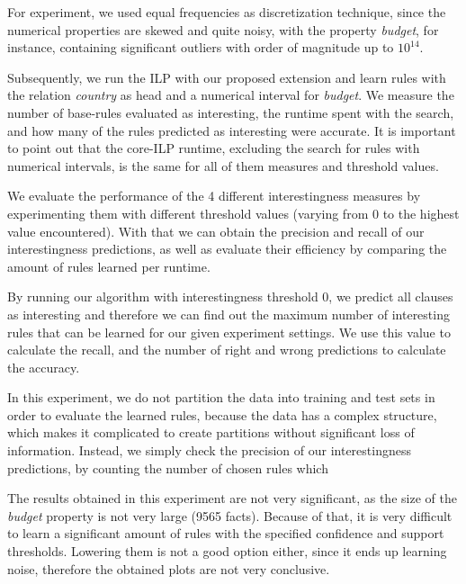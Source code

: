 For experiment, we used equal frequencies as discretization technique, since the numerical properties are skewed and
quite noisy, with the property \emph{budget}, for instance, containing significant outliers with order of magnitude up
to $10^{14}$.

Subsequently, we run the ILP with our proposed extension and learn rules with the relation \emph{country} as head and a
numerical interval for \emph{budget}. We measure the number of base-rules evaluated as interesting, the runtime spent
with the search, and how many of the rules predicted as interesting were accurate. It is important to point out that
the core-ILP runtime, excluding the search for rules with numerical intervals, is the same for all of them measures and
threshold values. 

We evaluate the performance of the 4 different interestingness measures by experimenting them with different threshold
values (varying from 0 to the highest value encountered). With that we can obtain the precision and recall of our
interestingness predictions, as well as evaluate their efficiency by comparing the amount of rules learned per runtime.

By running our algorithm with interestingness threshold 0, we predict all clauses as interesting and therefore we can
find out the maximum number of interesting rules that can be learned for our given experiment settings. We use this
value to calculate
the recall, and the number of right and wrong predictions to calculate the accuracy.


In this experiment, we do not partition the data into training and test sets in order to evaluate the learned rules,
because the data has a complex structure, which makes it complicated to create partitions without significant loss of
information. Instead, we simply check the precision of our interestingness predictions, by counting the number of chosen
rules which 

The results obtained in this experiment are not very significant, as the size of the \emph{budget} property is
not very large (9565 facts). Because of that, it is very difficult to learn a significant amount of rules with the
specified confidence and support thresholds. Lowering them is not a good option either, since it ends up learning
noise, therefore the obtained plots are not very conclusive.

